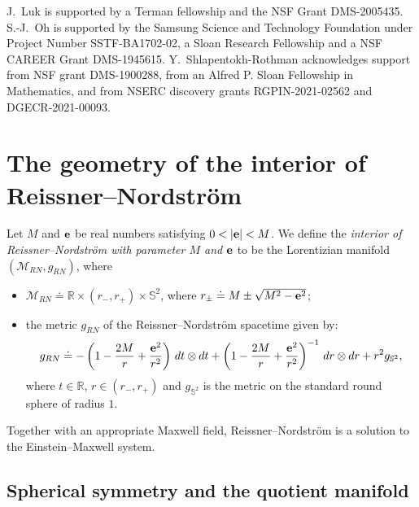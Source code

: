 \documentclass[10pt, reqno]{amsart}
\theoremstyle{definition}
\theoremstyle{remark}
\numberwithin{equation}{section}
\newcommand{\0}{\emptyset}
\newcommand{\f}{\frac}
\begin{document}
J.~Luk is supported by a Terman fellowship and the NSF Grant DMS-2005435. S.-J.~Oh is supported by the Samsung Science and Technology Foundation under Project Number SSTF-BA1702-02, a Sloan Research Fellowship and a NSF CAREER Grant DMS-1945615. Y.~Shlapentokh-Rothman acknowledges support from NSF grant DMS-1900288, from an Alfred P. Sloan Fellowship in Mathematics, and from NSERC discovery grants RGPIN-2021-02562 and DGECR-2021-00093. 

\section{The geometry of the interior of Reissner--Nordstr\"om}\label{sec.geometry}


Let $M$ and ${\bf e}$ be real numbers satisfying $0<|{\bf e}|<M$. We define the \emph{interior of Reissner--Nordstr\"om with parameter $M$ and ${\bf e}$} to be the Lorentizian manifold $(\mathcal M_{RN}, g_{RN})$, where 
\begin{itemize}
\item $\mathcal M_{RN} \doteq \mathbb R\times (r_-,r_+)\times \mathbb S^2$, where $r_\pm \doteq M\pm\sqrt{M^2-{\bf e}^2}$; 
\item the metric $g_{RN}$ of the Reissner--Nordstr\"om spacetime given by:
\begin{equation}\label{RN.metric}
g_{RN} \doteq -\left(1-\f {2M} r+\f{{\bf e}^2}{r^2}\right)\,dt\otimes dt + \left(1-\f {2M} r+\f{{\bf e}^2}{r^2}\right)^{-1}\, dr\otimes dr + r^2 g_{\mathbb S^2},
\end{equation}
where $t\in \mathbb R$, $r\in (r_-,r_+)$ and $g_{\mathbb S^2}$ is the metric on the standard round sphere of radius $1$.
\end{itemize}
Together with an appropriate Maxwell field, Reissner--Nordstr\"om is a solution to the Einstein--Maxwell system.

\subsection{Spherical symmetry and the quotient manifold}
\end{document}
